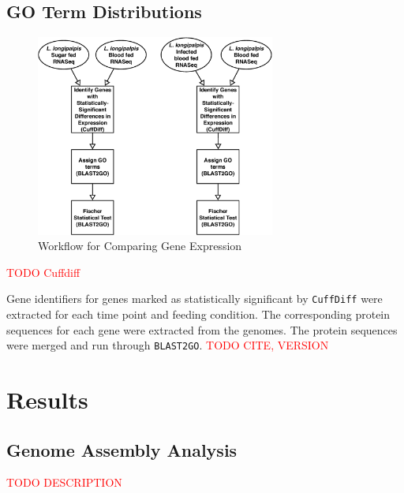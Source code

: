 \subsection{GO Term Distributions}

\begin{figure}[H]
  \centering
  \includegraphics[width=0.7\textwidth]{figures/rnaseq/cuffdiff_workflow}
  \caption{Workflow for Comparing Gene Expression}
  \label{fig:rnaseq-cuffdiff-workflow}
\end{figure}

\textcolor{red}{TODO Cuffdiff}

Gene identifiers for genes marked as statistically significant by \texttt{CuffDiff} were extracted for each time point and feeding condition.  The corresponding protein sequences for each gene were extracted from the genomes.  The protein sequences were merged and run through \texttt{BLAST2GO}. \textcolor{red}{TODO CITE, VERSION}

\section{Results}

\subsection{Genome Assembly Analysis}

\textcolor{red}{TODO DESCRIPTION}

